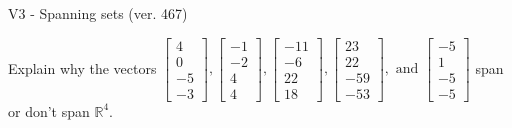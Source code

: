 \begin{exercise}
  \begin{exerciseTitle}V3 - Spanning sets (ver. 467)\end{exerciseTitle}
  \begin{exerciseStatement}
    Explain why the vectors \(\left[\begin{array}{r}
4 \\
0 \\
-5 \\
-3
\end{array}\right] , \left[\begin{array}{r}
-1 \\
-2 \\
4 \\
4
\end{array}\right] , \left[\begin{array}{r}
-11 \\
-6 \\
22 \\
18
\end{array}\right] , \left[\begin{array}{r}
23 \\
22 \\
-59 \\
-53
\end{array}\right] , \text{ and } \left[\begin{array}{r}
-5 \\
1 \\
-5 \\
-5
\end{array}\right]\) span or don't span \(\mathbb{R}^4\). 
	



\end{exerciseStatement}
\end{exercise}
